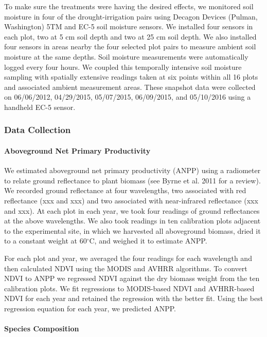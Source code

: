 \documentclass[12pt,]{article}
\let\oldparagraph\paragraph
\renewcommand{\paragraph}[1]{\oldparagraph{#1}\mbox{}}
\begin{document}
To make sure the treatments were having the desired effects, we
monitored soil moisture in four of the drought-irrigation pairs using
Decagon Devices (Pulman, Washington) 5TM and EC-5 soil moisture sensors.
We installed four sensors in each plot, two at 5 cm soil depth and two
at 25 cm soil depth. We also installed four sensors in areas nearby the
four selected plot pairs to measure ambient soil moisture at the same
depths. Soil moisture measurements were automatically logged every four
hours. We coupled this temporally intensive soil moisture sampling with
spatially extensive readings taken at six points within all 16 plots and
associated ambient measurement areas. These snapshot data were collected
on 06/06/2012, 04/29/2015, 05/07/2015, 06/09/2015, and 05/10/2016 using
a handheld EC-5 sensor.

\subsubsection{Data Collection}\label{data-collection}

\paragraph{Aboveground Net Primary
Productivity}\label{aboveground-net-primary-productivity}

We estimated aboveground net primary productivity (ANPP) using a
radiometer to relate ground reflectance to plant biomass (see Byrne et
al. 2011 for a review). We recorded ground reflectance at four
wavelengths, two associated with red reflectance (xxx and xxx) and two
associated with near-infrared reflectance (xxx and xxx). At each plot in
each year, we took four readings of ground reflectances at the above
wavelengths. We also took readings in ten calibration plots adjacent to
the experimental site, in which we harvested all aboveground biomass,
dried it to a constant weight at 60\(^{\circ}\)C, and weighed it to
estimate ANPP.

For each plot and year, we averaged the four readings for each
wavelength and then calculated NDVI using the MODIS and AVHRR
algorithms. To convert NDVI to ANPP we regressed NDVI against the dry
biomass weight from the ten calibration plots. We fit regressions to
MODIS-based NDVI and AVHRR-based NDVI for each year and retained the
regression with the better fit. Using the best regression equation for
each year, we predicted ANPP.

\paragraph{Species Composition}\label{species-composition}
\end{document}
